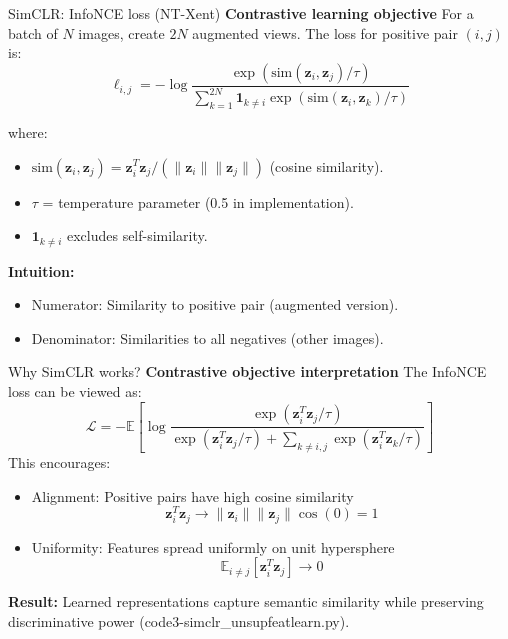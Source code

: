 \documentclass{beamer}
\begin{document}
\begin{frame}{SimCLR: InfoNCE loss (NT-Xent)}
\textbf{Contrastive learning objective}
For a batch of $N$ images, create $2N$ augmented views. The loss for positive pair $(i, j)$ is:
$$\ell_{i,j} = -\log \frac{\exp(\text{sim}(\mathbf{z}_i, \mathbf{z}_j) / \tau)}{\sum_{k=1}^{2N} \mathbf{1}_{k \neq i} \exp(\text{sim}(\mathbf{z}_i, \mathbf{z}_k) / \tau)}$$

\vspace{0.3cm}
where:
\begin{itemize}
\item $\text{sim}(\mathbf{z}_i, \mathbf{z}_j) = \mathbf{z}_i^T \mathbf{z}_j / (\|\mathbf{z}_i\| \|\mathbf{z}_j\|)$ (cosine similarity).
\item $\tau$ = temperature parameter (0.5 in implementation).
\item $\mathbf{1}_{k \neq i}$ excludes self-similarity.
\end{itemize}

\vspace{0.3cm}
\textbf{Intuition:} 
\begin{itemize}
\item \alert{Numerator:} Similarity to positive pair (augmented version).
\item \alert{Denominator:} Similarities to all negatives (other images).
\end{itemize}
\end{frame}

\begin{frame}{Why SimCLR works?}
\textbf{Contrastive objective interpretation}
The InfoNCE loss can be viewed as:
$$\mathcal{L} = -\mathbb{E}\left[ \log \frac{\exp(\mathbf{z}_i^T \mathbf{z}_j / \tau)}{\exp(\mathbf{z}_i^T \mathbf{z}_j / \tau) + \sum_{k \neq i,j} \exp(\mathbf{z}_i^T \mathbf{z}_k / \tau)} \right]$$
\vspace{0.2cm}
This encourages:
\begin{itemize}
\item \alert{Alignment:} Positive pairs have high cosine similarity
  $$\mathbf{z}_i^T \mathbf{z}_j \rightarrow \|\mathbf{z}_i\| \|\mathbf{z}_j\| \cos(0) = 1$$
\item \alert{Uniformity:} Features spread uniformly on unit hypersphere
  $$\mathbb{E}_{i \neq j}[\mathbf{z}_i^T \mathbf{z}_j] \rightarrow 0$$
\end{itemize}
\vspace{0.3cm}
\textbf{Result:} Learned representations capture semantic similarity while preserving discriminative power (code3-simclr\_unsupfeatlearn.py).
\end{frame}
\end{document}
